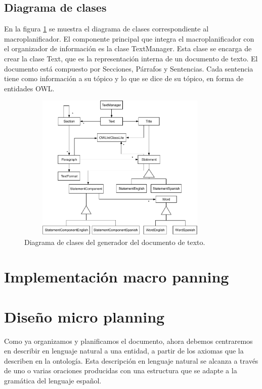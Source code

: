 \subsection{Diagrama de clases}
En la figura \ref{fig:diagrama_clases_macroplanificador} se muestra el diagrama de clases correspondiente al macroplanificador. El componente principal que integra el macroplanificador con el organizador de información es la clase TextManager. Esta clase se encarga de crear la clase Text, que es la representación interna de un documento de texto. El documento está compuesto por Secciones, Párrafos y Sentencias. Cada sentencia tiene como información a su tópico y lo que se dice de su tópico, en forma de entidades OWL.

\begin{figure}[H]
    \centering
    \includegraphics[width=10cm, height=7cm]{img/generacion_documento/diagrama_clases_macroplanificador.pdf}
    \caption{Diagrama de clases del generador del documento de texto.}
    \label{fig:diagrama_clases_macroplanificador}
\end{figure}

\section{Implementación macro panning}

\section{Diseño micro planning}

Como ya organizamos y planificamos el documento, ahora debemos centraremos en describir en lenguaje natural a una entidad, a partir de los axiomas que la describen en la ontología. Esta descripción en lenguaje natural se alcanza a través de uno o varias oraciones producidas con una estructura que se adapte a la gramática del lenguaje español.

